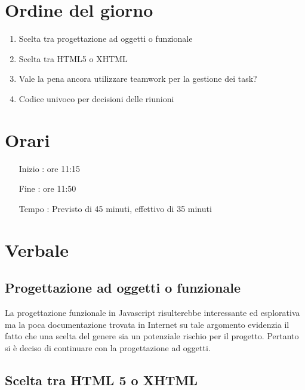 \documentclass[11pt]{meetingmins}
\begin{document}
\maketitle

\section{Ordine del giorno}

\begin{enumerate}
 \item Scelta tra progettazione ad oggetti o funzionale
 \item Scelta tra HTML5 o XHTML
 \item Vale la pena ancora utilizzare teamwork per la gestione dei task?
 \item Codice univoco per decisioni delle riunioni 
\end{enumerate}

\section{Orari}

\begin{itemize}
\item[Inizio]: ore 11:15
\item[Fine]: ore 11:50
\item[Tempo]: Previsto di 45 minuti, effettivo di 35 minuti

\end{itemize}

\section{Verbale}

\subsection{Progettazione ad oggetti o funzionale}
La progettazione funzionale in Javascript risulterebbe interessante ed esplorativa ma la poca documentazione trovata in Internet su tale argomento evidenzia il fatto che una scelta del genere sia un potenziale rischio per il progetto.
Pertanto si è deciso di continuare con la progettazione ad oggetti.

\subsection{Scelta tra HTML 5 o XHTML}
\end{document}

